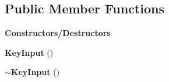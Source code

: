 \subsection*{Public Member Functions}
\begin{Indent}\textbf{ Constructors/\+Destructors}\par
\begin{DoxyCompactItemize}
\item 
\mbox{\label{structrev_1_1_key_input_a85bfc77779f464272a46345d1bab01ce}} 
{\bfseries Key\+Input} ()
\item 
\mbox{\label{structrev_1_1_key_input_a33600dec51091abce9e94e804ebf80de}} 
{\bfseries $\sim$\+Key\+Input} ()
\end{DoxyCompactItemize}
\end{Indent}
